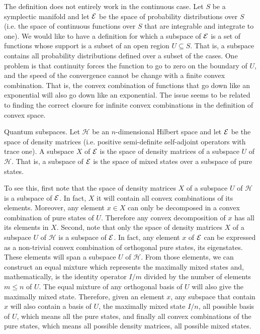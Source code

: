 \begin{remark}
	The definition does not entirely work in the continuous case. Let $S$ be a symplectic manifold and let $\mathcal{E}$ be the space of probability distributions over $S$ (i.e. the space of continuous functions over $S$ that are integrable and integrate to one). We would like to have a definition for which a subspace of $\mathcal{E}$ is a set of functions whose support is a subset of an open region $U \subseteq S$. That is, a subspace contains all probability distributions defined over a subset of the cases. One problem is that continuity forces the function to go to zero on the boundary of $U$, and the speed of the convergence cannot be change with a finite convex combination. That is, the convex combination of functions that go down like an exponential will also go down like an exponential. The issue seems to be related to finding the correct closure for infinite convex combinations in the definition of convex space.
\end{remark}

\begin{example} Quantum subspaces.
	Let $\mathcal{H}$ be an $n$-dimensional Hilbert space and let $\mathcal{E}$ be the space of density matrices (i.e. positive semi-definite self-adjoint operators with trace one). A subspace $X$ of $\mathcal{E}$ is the space of density matrices of a subspace $U$ of $\mathcal{H}$. That is, a subspace of $\mathcal{E}$ is the space of mixed states over a subspace of pure states.
	
	To see this, first note that the space of density matrices $X$ of a subspace $U$ of $\mathcal{H}$ is a subspace of $\mathcal{E}$. In fact, $X$ it will contain all convex combinations of its elements. Moreover, any element $x \in X$ can only be decomposed in a convex combination of pure states of $U$. Therefore any convex decomposition of $x$ has all its elements in $X$. Second, note that only the space of density matrices $X$ of a subspace $U$ of $\mathcal{H}$ is a subspace of $\mathcal{E}$. In fact, any element $x$ of $\mathcal{E}$ can be expressed as a non-trivial convex combination of orthogonal pure states, its eigenstates. These elements will span a subspace $U$ of $\mathcal{H}$. From those elements, we can construct an equal mixture which represents the maximally mixed states and, mathematically, is the identity operator $I/m$ divided by the number of elements $m \leq n$ of $U$. The equal mixture of any orthogonal basis of $U$ will also give the maximally mixed state. Therefore, given an element $x$, any subspace that contain $x$ will also contain a basis of $U$, the maximally mixed state $I/n$, all possible basis of $U$, which means all the pure states, and finally all convex combinations of the pure states, which means all possible density matrices, all possible mixed states.
\end{example}

